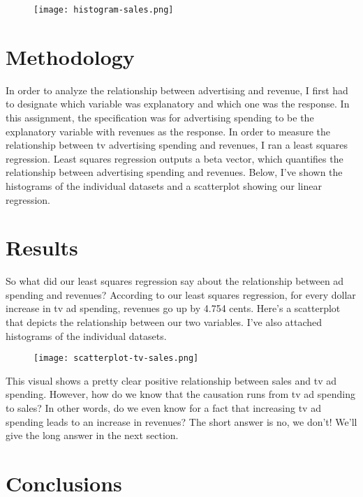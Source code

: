 \documentclass{article}
\begin{document}
\graphicspath{ {../../stat159-fall2016-hw02/images/} }
\begin{figure}
\texttt{[image: histogram-sales.png]}
\end{figure}


\section{Methodology}

In order to analyze the relationship between advertising and revenue, I first had to designate which variable was explanatory and which one was the response. In this assignment, the specification was for advertising spending to be the explanatory variable with revenues as the response. In order to measure the relationship between tv advertising spending and revenues, I ran a least squares regression. Least squares regression outputs a beta vector, which quantifies the relationship between advertising spending and revenues.  Below, I've shown the histograms of the individual datasets and a scatterplot showing our linear regression.

\section{Results}

So what did our least squares regression say about the relationship between ad spending and revenues? According to our least squares regression, for every dollar increase in tv ad spending, revenues go up by 4.754 cents. Here's a scatterplot that depicts the relationship between our two variables. I've also attached histograms of the individual datasets. 

\graphicspath{ {../../stat159-fall2016-hw02/images/} }
\begin{figure}
\texttt{[image: scatterplot-tv-sales.png]}
\end{figure}


This visual shows a pretty clear positive relationship between sales and tv ad spending. However, how do we know that the causation runs from tv ad spending to sales? In other words, do we even know for a fact that increasing tv ad spending leads to an increase in revenues? The short answer is no, we don't! We'll give the long answer in the next section.  

\section{Conclusions}
\end{document}
